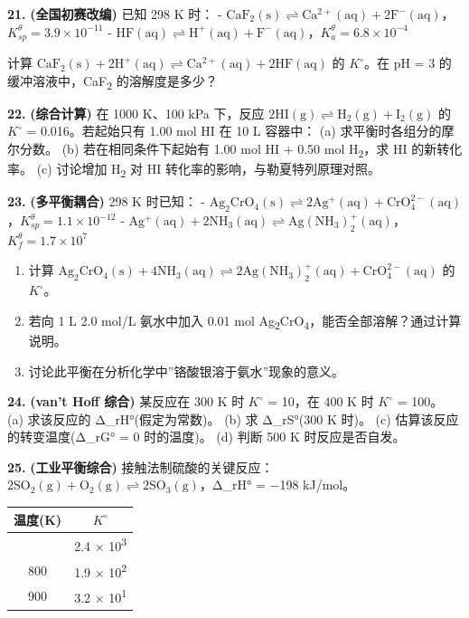 \documentclass[a4paper,11pt]{ctexart}
\providecommand{\tightlist}{\setlength{\itemsep}{0pt}\setlength{\parskip}{0pt}}
\newcounter{none}
\begin{document}
\textbf{21.} \textbf{(全国初赛改编)} 已知 298 K 时：
- \(\mathrm{CaF_2(s) \rightleftharpoons Ca^{2+}(aq) + 2F^-(aq)}\)，\(K_{sp}^\theta = 3.9 \times 10^{-11}\)
- \(\mathrm{HF(aq) \rightleftharpoons H^+(aq) + F^-(aq)}\)，\(K_a^\theta = 6.8 \times 10^{-4}\)

计算 \(\mathrm{CaF_2(s) + 2H^+(aq) \rightleftharpoons Ca^{2+}(aq) + 2HF(aq)}\) 的 \(K^{\circ}\)。在 pH = 3 的缓冲溶液中，CaF\textsubscript{2} 的溶解度是多少？

\textbf{22.} \textbf{(综合计算)} 在 1000 K、100 kPa 下，反应 \(\mathrm{2HI(g) \rightleftharpoons H_2(g) + I_2(g)}\) 的 \(K^{\circ}\) = 0.016。若起始只有 1.00 mol HI 在 10 L 容器中：
(a) 求平衡时各组分的摩尔分数。
(b) 若在相同条件下起始有 1.00 mol HI + 0.50 mol H\textsubscript{2}，求 HI 的新转化率。
(c) 讨论增加 H\textsubscript{2} 对 HI 转化率的影响，与勒夏特列原理对照。

\textbf{23.} \textbf{(多平衡耦合)} 298 K 时已知：
- \(\mathrm{Ag_2CrO_4(s) \rightleftharpoons 2Ag^+(aq) + CrO_4^{2-}(aq)}\)，\(K_{sp}^\theta = 1.1 \times 10^{-12}\)
- \(\mathrm{Ag^+(aq) + 2NH_3(aq) \rightleftharpoons Ag(NH_3)_2^+(aq)}\)，\(K_f^\theta = 1.7 \times 10^7\)

\begin{enumerate}
\def\labelenumi{(\alph{enumi})}
\tightlist
\item
  计算 \(\mathrm{Ag_2CrO_4(s) + 4NH_3(aq) \rightleftharpoons 2Ag(NH_3)_2^+(aq) + CrO_4^{2-}(aq)}\) 的 \(K^{\circ}\)。
\item
  若向 1 L 2.0 mol/L 氨水中加入 0.01 mol Ag\textsubscript{2}CrO\textsubscript{4}，能否全部溶解？通过计算说明。
\item
  讨论此平衡在分析化学中''铬酸银溶于氨水''现象的意义。
\end{enumerate}

\textbf{24.} \textbf{(van't Hoff 综合)} 某反应在 300 K 时 \(K^{\circ}\) = 10，在 400 K 时 \(K^{\circ}\) = 100。
(a) 求该反应的 Δ\_rH°(假定为常数)。
(b) 求 Δ\_rS°(300 K 时)。
(c) 估算该反应的转变温度(Δ\_rG° = 0 时的温度)。
(d) 判断 500 K 时反应是否自发。

\textbf{25.} \textbf{(工业平衡综合)} 接触法制硫酸的关键反应：\(\mathrm{2SO_2(g) + O_2(g) \rightleftharpoons 2SO_3(g)}\)，Δ\_rH° = −198 kJ/mol。

{\def\LTcaptype{none} %
\begin{longtable}[]{@{}cc@{}}
\toprule\noalign{}
温度(K) & \(K^{\circ}\) \\
\midrule\noalign{}
\endhead
\bottomrule\noalign{}
\endlastfoot
700 & 2.4 × 10\textsuperscript{3} \\
800 & 1.9 × 10\textsuperscript{2} \\
900 & 3.2 × 10\textsuperscript{1} \\
\end{longtable}
}
\end{document}
